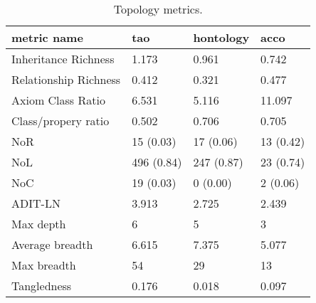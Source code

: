 \begin{table}
\centering
\caption{Topology metrics.}
\label{tab:topology-metrics}
\begin{tabular}{p{2.5cm}|p{1cm}p{1cm}p{1cm}}
\toprule
          metric name &        tao &  hontology &      acco \\
\midrule
 Inheritance Richness &      1.173 &      0.961 &     0.742 \\
Relationship Richness &      0.412 &      0.321 &     0.477 \\
    Axiom Class Ratio &      6.531 &      5.116 &    11.097 \\
  Class/propery ratio &      0.502 &      0.706 &     0.705 \\
                  NoR &  15 (0.03) &  17 (0.06) & 13 (0.42) \\
                  NoL & 496 (0.84) & 247 (0.87) & 23 (0.74) \\
                  NoC &  19 (0.03) &   0 (0.00) &  2 (0.06) \\
              ADIT-LN &      3.913 &      2.725 &     2.439 \\
            Max depth &          6 &          5 &         3 \\
      Average breadth &      6.615 &      7.375 &     5.077 \\
          Max breadth &         54 &         29 &        13 \\
          Tangledness &      0.176 &      0.018 &     0.097 \\
\bottomrule
\end{tabular}
\end{table}
